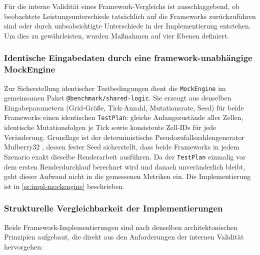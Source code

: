 Für die interne Validität eines Framework-Vergleichs ist ausschlaggebend, ob beobachtete Leistungsunterschiede tatsächlich auf die Frameworks zurückzuführen sind oder durch unbeabsichtigte Unterschiede in der Implementierung entstehen. Um dies zu gewährleisten, wurden Maßnahmen auf vier Ebenen definiert.

\subsubsection{Identische Eingabedaten durch eine framework-unabhängige MockEngine}
\label{sss:mock-engine-validity}

Zur Sicherstellung identischer Testbedingungen dient die \texttt{MockEngine} im gemeinsamen Paket \texttt{@benchmark/shared-logic}. Sie erzeugt aus denselben Eingabeparametern (Grid-Größe, Tick-Anzahl, Mutationsrate, Seed) für beide Frameworks einen identischen \texttt{TestPlan}: gleiche Anfangszustände aller Zellen, identische Mutationsfolgen je Tick sowie konsistente Zell-IDs für jede Veränderung. Grundlage ist der deterministische Pseudozufallszahlengenerator Mulberry32 \cite{ettinger-mulberry32-2017}, dessen fester Seed sicherstellt, dass beide Frameworks in jedem Szenario exakt dieselbe Renderarbeit ausführen. Da der \texttt{TestPlan} einmalig vor dem ersten Renderdurchlauf berechnet wird und danach unveränderlich bleibt, geht dieser Aufwand nicht in die gemessenen Metriken ein. Die Implementierung ist in \cref{ss:impl-mockengine} beschrieben.     

\subsubsection{Strukturelle Vergleichbarkeit der Implementierungen}
\label{sss:parity}

Beide Framework-Implementierungen sind nach denselben architektonischen Prinzipien aufgebaut, die direkt aus den Anforderungen der internen Validität hervorgehen:

